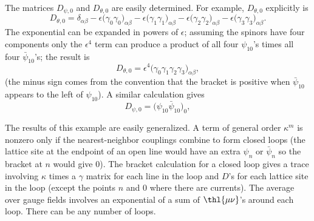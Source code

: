 The matrices $D_{\psi,0}$ and $D_{\theta,0}$ are easily determined.  For
example, $D_{\theta,0}$ explicitly is
\begin{equation}
D_{\theta,0} = \delta_{\alpha\beta}
  - \epsilon\bigl(\gamma_{0}\gamma_{0}\bigr)_{\alpha\beta}
  - \epsilon\bigl(\gamma_{1}\gamma_{1}\bigr)_{\alpha\beta}
  - \epsilon\bigl(\gamma_{2}\gamma_{2}\bigr)_{\alpha\beta}
  - \epsilon\bigl(\gamma_{3}\gamma_{3}\bigr)_{\alpha\beta}.
\label{eq:3.42}
\end{equation}
The exponential can be expanded in powers of $\epsilon$; assuming the
spinors have four components only the $\epsilon^{4}$ term can produce a
product of all four $\psi_{10}$'s times all four $\bar\psi_{10}$'s; the
result is
\begin{equation}
D_{\theta,0} = \epsilon^{4}\bigl(\gamma_{0}\gamma_{1}\gamma_{2}\gamma_{3}\bigr)_{\alpha\beta},
\label{eq:3.43}
\end{equation}
(the minus sign comes from the convention that the bracket is positive
when $\bar\psi_{10}$ appears to the left of $\psi_{10}$).  A similar
calculation gives
\begin{equation}
D_{\psi,0} = \bigl(\psi_{10}\bar\psi_{10}\bigr)_{0},
\label{eq:3.44}
\end{equation}

The results of this example are easily generalized.  A term of general
order $\kappa^{m}$ is nonzero only if the nearest-neighbor couplings
combine to form closed loops (the lattice site at the endpoint of an open
line would have an extra $\psi_{n}$ or $\bar\psi_{n}$ so the bracket at
$n$ would give 0).  The bracket calculation for a closed loop gives a
trace involving $\kappa$ times a $\gamma$ matrix for each line in the
loop and $D$'s for each lattice site in the loop (except the points $n$
and $0$ where there are currents).  The average over gauge fields
involves an exponential of a sum of $\thl{\mu\nu}$'s around each loop.
There can be any number of loops.
